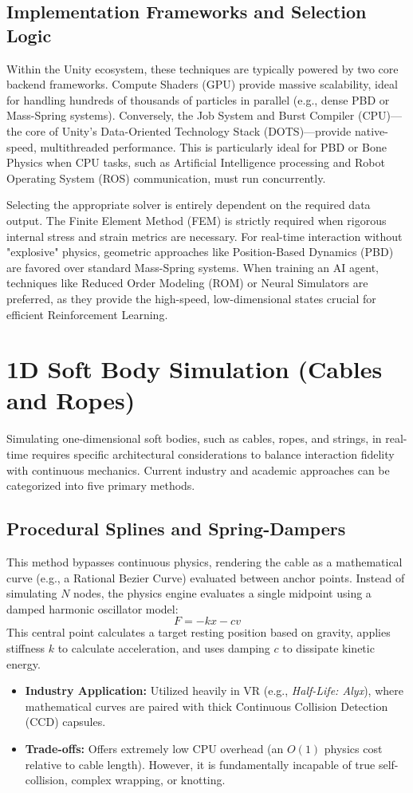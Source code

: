 \documentclass[a4paper,12pt]{report}
\begin{document}
\subsection{Implementation Frameworks and Selection Logic}
Within the Unity ecosystem, these techniques are typically powered by two core backend frameworks. Compute Shaders (GPU) provide massive scalability, ideal for handling hundreds of thousands of particles in parallel (e.g., dense PBD or Mass-Spring systems). Conversely, the Job System and Burst Compiler (CPU)—the core of Unity's Data-Oriented Technology Stack (DOTS)—provide native-speed, multithreaded performance. This is particularly ideal for PBD or Bone Physics when CPU tasks, such as Artificial Intelligence processing and Robot Operating System (ROS) communication, must run concurrently.

Selecting the appropriate solver is entirely dependent on the required data output. The Finite Element Method (FEM) is strictly required when rigorous internal stress and strain metrics are necessary. For real-time interaction without "explosive" physics, geometric approaches like Position-Based Dynamics (PBD) are favored over standard Mass-Spring systems. When training an AI agent, techniques like Reduced Order Modeling (ROM) or Neural Simulators are preferred, as they provide the high-speed, low-dimensional states crucial for efficient Reinforcement Learning.

\section{1D Soft Body Simulation (Cables and Ropes)}
Simulating one-dimensional soft bodies, such as cables, ropes, and strings, in real-time requires specific architectural considerations to balance interaction fidelity with continuous mechanics. Current industry and academic approaches can be categorized into five primary methods.

\subsection{Procedural Splines and Spring-Dampers}
This method bypasses continuous physics, rendering the cable as a mathematical curve (e.g., a Rational Bezier Curve) evaluated between anchor points. Instead of simulating $N$ nodes, the physics engine evaluates a single midpoint using a damped harmonic oscillator model:
$$F=-kx-cv$$
This central point calculates a target resting position based on gravity, applies stiffness $k$ to calculate acceleration, and uses damping $c$ to dissipate kinetic energy.
\begin{itemize}
    \item \textbf{Industry Application:} Utilized heavily in VR (e.g., \textit{Half-Life: Alyx}), where mathematical curves are paired with thick Continuous Collision Detection (CCD) capsules.
    \item \textbf{Trade-offs:} Offers extremely low CPU overhead (an $O(1)$ physics cost relative to cable length). However, it is fundamentally incapable of true self-collision, complex wrapping, or knotting.
\end{itemize}
\end{document}
